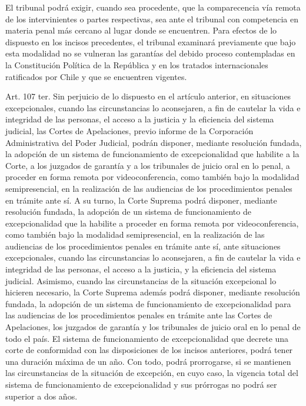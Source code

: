     El tribunal podrá exigir, cuando sea procedente, que la comparecencia vía remota de los intervinientes o partes respectivas, sea ante el tribunal con competencia en materia penal más cercano al lugar donde se encuentren.
    Para efectos de lo dispuesto en los incisos precedentes, el tribunal examinará previamente que bajo esta modalidad no se vulneran las garantías del debido proceso contempladas en la Constitución Política de la República y en los tratados internacionales ratificados por Chile y que se encuentren vigentes.

    Art. 107 ter. Sin perjuicio de lo dispuesto en el artículo anterior, en situaciones excepcionales, cuando las circunstancias lo aconsejaren, a fin de cautelar la vida e integridad de las personas, el acceso a la justicia y la eficiencia del sistema judicial, las Cortes de Apelaciones, previo informe de la Corporación Administrativa del Poder Judicial, podrán disponer, mediante resolución fundada, la adopción de un sistema de funcionamiento de excepcionalidad que habilite a la Corte, a los juzgados de garantía y a los tribunales de juicio oral en lo penal, a proceder en forma remota por videoconferencia, como también bajo la modalidad semipresencial, en la realización de las audiencias de los procedimientos penales en trámite ante sí.
    A su turno, la Corte Suprema podrá disponer, mediante resolución fundada, la adopción de un sistema de funcionamiento de excepcionalidad que la habilite a proceder en forma remota por videoconferencia, como también bajo la modalidad semipresencial, en la realización de las audiencias de los procedimientos penales en trámite ante sí, ante situaciones excepcionales, cuando las circunstancias lo aconsejaren, a fin de cautelar la vida e integridad de las personas, el acceso a la justicia, y la eficiencia del sistema judicial. Asimismo, cuando las circunstancias de la situación excepcional lo hicieren necesario, la Corte Suprema además podrá disponer, mediante resolución fundada, la adopción de un sistema de funcionamiento de excepcionalidad para las audiencias de los procedimientos penales en trámite ante las Cortes de Apelaciones, los juzgados de garantía y los tribunales de juicio oral en lo penal de todo el país.
    El sistema de funcionamiento de excepcionalidad que decrete una corte de conformidad con las disposiciones de los incisos anteriores, podrá tener una duración máxima de un año. Con todo, podrá prorrogarse, si se mantienen las circunstancias de la situación de excepción, en cuyo caso, la vigencia total del sistema de funcionamiento de excepcionalidad y sus prórrogas no podrá ser superior a dos años.
